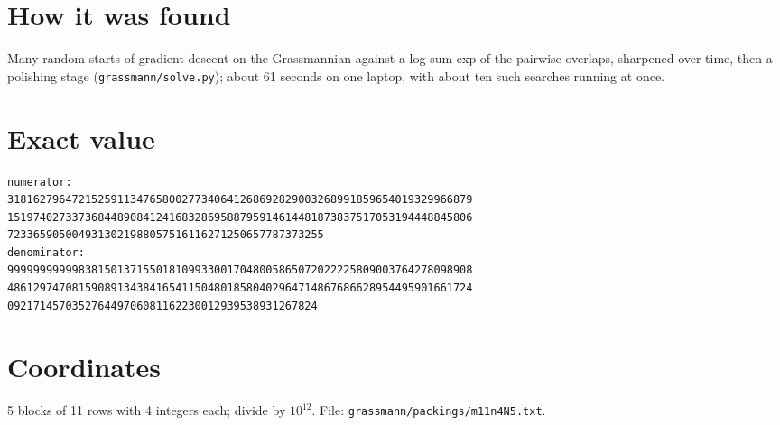 \documentclass[11pt,a4paper]{article}
\begin{document}
\section{How it was found}
Many random starts of gradient descent on the Grassmannian against a log-sum-exp of the pairwise overlaps, sharpened over time, then a polishing stage (\texttt{grassmann/solve.py}); about 61 seconds on one laptop, with about ten such searches running at once.


\appendix
\section{Exact value}
{\small
\begin{verbatim}
numerator:
318162796472152591134765800277340641268692829003268991859654019329966879
151974027337368448908412416832869588795914614481873837517053194448845806
7233659050049313021988057516116271250657787373255
denominator:
999999999998381501371550181099330017048005865072022225809003764278098908
486129747081590891343841654115048018580402964714867686628954495901661724
092171457035276449706081162230012939538931267824
\end{verbatim}}

\section{Coordinates}
5 blocks of 11 rows with 4 integers each; divide by $10^{12}$. File: \texttt{grassmann/packings/m11n4N5.txt}.
{\tiny
\begin{multicols}{3}
\end{multicols}}
\end{document}
